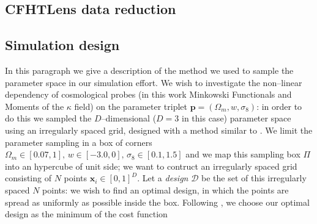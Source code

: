 \documentclass[reprint,aps,prd,superscriptaddress,showkeys]{revtex4-1}
\begin{document}
\subsection{CFHTLens data reduction}

\subsection{Simulation design}
In this paragraph we give a description of the method we used to sample the parameter space in our simulation effort. We wish to investigate the non--linear dependency of cosmological probes (in this work Minkowski Functionals and Moments of the $\kappa$ field) on the parameter triplet $\mathbf{p}=(\Omega_m,w,\sigma_8)$: in order to do this we sampled the $D$--dimensional ($D=3$ in this case) parameter space using an irregularly spaced grid, designed with a method similar to \citep{coyote2}. We limit the parameter sampling in a box of corners $\Omega_m\in[0.07,1],\,w\in[-3.0,0],\,\sigma_8\in[0.1,1.5]$ and we map this sampling box $\Pi$ into an hypercube of unit side; we want to contruct an irregularly spaced grid consisting of $N$ points $\mathbf{x}_i\in[0,1]^D$. Let a \textit{design} $\mathcal{D}$ be the set of this irregularly spaced $N$ points: we wish to find an optimal design, in which the points are spread as uniformly as possible inside the box. Following \citep{coyote2}, we choose our optimal design as the minimum of the cost function
\end{document}
